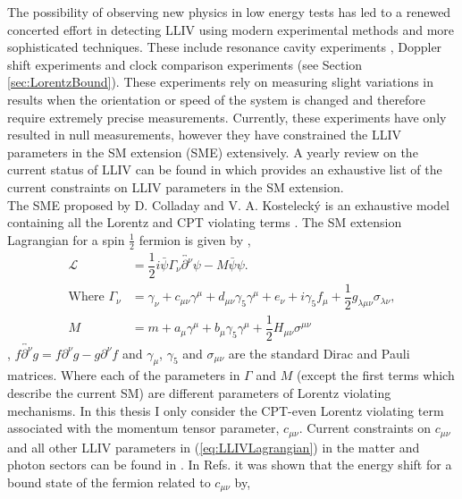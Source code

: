 \documentclass[10pt,a4paper, twoside, openright]{report}
\begin{document}
The possibility of observing new physics in low energy tests has led to a renewed concerted effort in detecting LLIV using modern experimental methods and more sophisticated techniques. These include  resonance cavity experiments \cite{Muller2005, Muller2003, Wolf2004}, Doppler shift experiments \cite{Lane2005, Saathoff2003} and clock comparison experiments \cite{Prestage1985, Chupp1989, Hohensee2013, Dzuba2016} (see Section \ref{sec:LorentzBound}). These experiments rely on measuring slight variations in results when the orientation or speed of the system is changed and therefore require extremely precise measurements. Currently, these experiments have only resulted in null measurements, however they have constrained the LLIV parameters in the SM extension (SME) extensively. A yearly review on the current status of LLIV can be found in \cite{LorentzDataTables2019} which provides an exhaustive list of the current constraints on LLIV parameters in the SM extension.\\
\linebreak
The SME proposed by D. Colladay and V. A. Kosteleck\'{y} is an exhaustive model containing all the Lorentz and CPT violating terms \cite{Colladay1997, Colladay1998, Kostelecky1999, LorentzDataTables2019}. The SM extension Lagrangian for a spin $\tfrac{1}{2}$ fermion is given by \cite{Colladay1997},
\begin{align}
\mathcal{L} &= \dfrac{1}{2}i\bar{\psi}\Gamma_{\nu}\overleftrightarrow{\partial^{\nu}}\psi - M\bar{\psi}\psi. \label{eq:LLIVLagrangian} \\
\text{Where } \Gamma_{\nu} &= \gamma_{\nu} + c_{\mu\nu}\gamma^{\mu} + d_{\mu\nu}\gamma_{5}\gamma^{\mu} + e_{\nu} + i\gamma_5f_{\mu} + \dfrac{1}{2}g_{\lambda\mu\nu}\sigma_{\lambda\nu}, \nonumber \\
M &= m + a_{\mu}\gamma^{\mu} + b_{\mu}\gamma_{5}\gamma^{\mu} + \dfrac{1}{2}H_{\mu\nu}\sigma^{\mu\nu} \nonumber
\end{align}
, $f\overleftrightarrow{\partial^{\nu}}g = f\partial^{\nu}g - g\partial^{\nu}f$ and $\gamma_{\mu}$, $\gamma_5$ and $\sigma_{\mu\nu}$ are the standard Dirac and Pauli matrices. Where each of the parameters in $\Gamma$ and  $M$ (except the first terms which describe the current SM) are different parameters of Lorentz violating mechanisms.  In this thesis I only consider the CPT-even Lorentz violating term associated with the momentum tensor parameter, $c_{\mu\nu}$. Current constraints on $c_{\mu\nu}$ and all other LLIV parameters in (\ref{eq:LLIVLagrangian}) in the matter and photon sectors can be found in \cite{LorentzDataTables2019}. In Refs. \cite{Kostelecky1999, Hohensee2013} it was shown that the energy shift for a bound state of the fermion related to $c_{\mu\nu}$ by,
\end{document}
